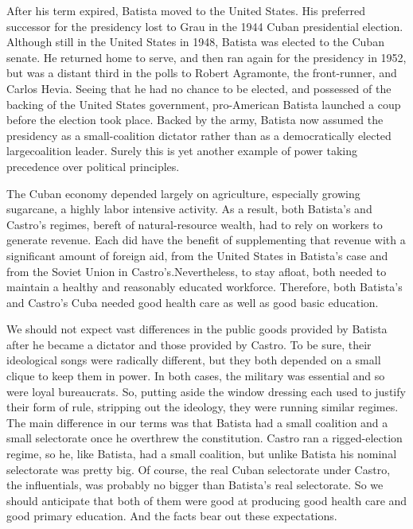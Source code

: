 \documentclass[10pt]{article}
\begin{document}
{\large After his term expired, Batista moved to the United States. His
preferred successor for the presidency lost to Grau in the 1944 Cuban
presidential election. Although still in the United States in 1948, Batista was
elected to the Cuban senate. He returned home to serve, and then ran again for
the presidency in 1952, but was a distant third in the polls to Robert Agramonte,
the front-runner, and Carlos Hevia. Seeing that he had no chance to be elected,
and possessed of the backing of the United States government, pro-American
Batista launched a coup before the election took place. Backed by the army,
Batista now assumed the presidency as a small-coalition dictator rather than as a
democratically elected largecoalition leader. Surely this is yet another example
of power taking precedence over political principles.}

{\large The Cuban economy depended largely on agriculture, especially growing
sugarcane, a highly labor intensive activity. As a result, both Batista's and
Castro's regimes, bereft of natural-resource wealth, had to rely on workers to
generate revenue. Each did have the benefit of supplementing that revenue with a
significant amount of foreign aid, from the United States in Batista's case and
from the Soviet Union in Castro's.Nevertheless, to stay afloat, both needed to
maintain a healthy and reasonably educated workforce. Therefore, both Batista's
and Castro's Cuba needed good health care as well as good basic education.}

{\large We should not expect vast differences in the public goods provided by
Batista after he became a dictator and those provided by Castro. To be sure,
their ideological songs were radically different, but they both depended on a
small clique to keep them in power. In both cases, the military was essential and
so were loyal bureaucrats. So, putting aside the window dressing each used to
justify their form of rule, stripping out the ideology, they were running similar
regimes. The main difference in our terms was that Batista had a small coalition
and a small selectorate once he overthrew the constitution. Castro ran a
rigged-election regime, so he, like Batista, had a small coalition, but unlike
Batista his nominal selectorate was pretty big. Of course, the real Cuban
selectorate under Castro, the influentials, was probably no bigger than Batista's
real selectorate. So we should anticipate that both of them were good at
producing good health care and good primary education. And the facts bear out
these expectations.}
\end{document}
